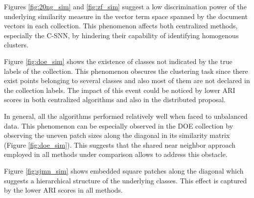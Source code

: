 \documentclass[a4paper]{article}
\begin{document}
Figures \ref{fig:20ng_sim} and \ref{fig:zf_sim} suggest a low discrimination power of the underlying similarity measure in the vector term space spanned by the document vectors in each collection. This phenomenon affects both centralized methods, especially the C-SNN, by hindering their capability of identifying homogenous clusters.

Figure \ref{fig:doe_sim} shows the existence of classes not indicated by the true labels of the collection. This phenomenon obscures the clustering task since there exist points belonging to several classes and also most of them are not declared in the collection labels. The impact of this event could be noticed by lower ARI scores in both centralized algorithms and also in the distributed proposal.

In general, all the algorithms performed relatively well when faced to unbalanced data. This phenomenon can be especially observed in the DOE collection by observing the uneven patch sizes along the diagonal in its similarity matrix (Figure \ref{fig:doe_sim}). This suggests that the shared near neighbor approach employed in all methods under comparison allows to address this obstacle.


Figure \ref{fig:sjmn_sim} shows embedded square patches along the diagonal which suggests a hierarchical structure of the underlying classes. This effect is captured by the lower ARI scores in all methods.


\end{document}
